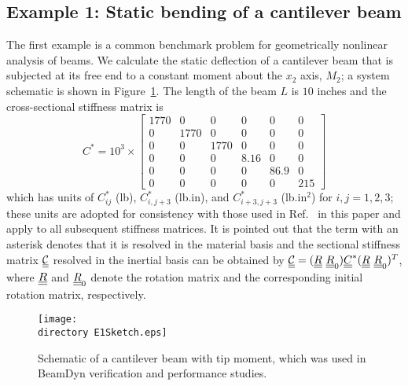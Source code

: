 \subsection{Example 1: Static bending of a cantilever beam}

The first example is a common benchmark problem for geometrically nonlinear
analysis of beams\cite{Simo1985,Xiao-Zhong:2012}. We calculate the static
deflection of a cantilever beam that is subjected at its free end to
a constant moment about the $x_2$ axis, $M_2$; a system schematic is shown in Figure~\ref{E1Sketch}.  The length of the beam $L$ is $10$ inches and the cross-sectional stiffness 
matrix is 
\begin{equation}
    \label{StifE1}
    C^* = 10^3 \times \begin{bmatrix}
	1770 & 0    & 0    & 0    & 0    & 0   \\
	 0    & 1770 & 0    & 0    & 0    & 0   \\
	 0   &   0   & 1770 & 0    & 0    & 0   \\
	 0   &   0   &  0    & 8.16 & 0    & 0   \\
	 0   &   0   &  0    &  0    & 86.9 & 0   \\
	 0   &   0   &  0    &  0    &   0   & 215
\end{bmatrix}
\end{equation}
which has units of $C_{ij}^*$ (lb), $C_{i,j+3}^*$ (lb.in), and
$C_{i+3,j+3}^*$ (lb.in$^2$) for $i,j = 1,2,3$; these units are adopted for consistency with those used in Ref.~\cite{Yu-etal:2002} in this paper and apply to all
subsequent stiffness matrices. It is pointed out that the term with an
asterisk denotes that it is resolved in the material basis and the sectional stiffness matrix $\underline{\underline{\mathcal{C}}}$ resolved in the inertial basis can be obtained by $\underline{\underline{\mathcal{C}}} = (\underline{\underline{R}}~\underline{\underline{R}}_0) \underline{\underline{C}}^*(\underline{\underline{R}}~\underline{\underline{R}}_0)^T$, where $\underline{\underline{R}}$ and $\underline{\underline{R}}_0$ denote the rotation matrix and the corresponding initial rotation matrix, respectively.

\begin{figure}
    \centering \texttt{[image: \\directory
E1Sketch.eps]} \caption{Schematic of a cantilever beam with tip moment,
which was used in BeamDyn verification and performance studies.}
    \label{E1Sketch}
\end{figure} 

